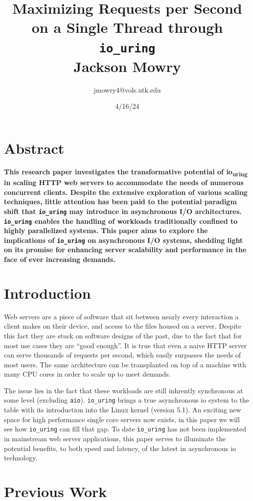 \documentclass[letterpaper, 10pt, twocolumn]{article}
\author{jmowry4@vols.utk.edu}
\date{4/16/24}
\title{\textbf{Maximizing Requests per Second on a Single Thread through \texttt{io\_uring}}\\\medskip
\large Jackson Mowry}
\begin{document}
\maketitle

\section{Abstract}
\label{sec:org684a27b}
\textbf{This research paper investigates the transformative potential of io\textsubscript{uring} in scaling HTTP web servers to accommodate the needs of numerous concurrent clients. Despite the extensive exploration of various scaling techniques, little attention has been paid to the potential paradigm shift that \texttt{io\_uring} may introduce in asynchronous I/O architectures. \texttt{io\_uring} enables the handling of workloads traditionally confined to highly parallelized systems. This paper aims to explore the implications of \texttt{io\_uring} on asynchronous I/O systems, shedding light on its promise for enhancing server scalability and performance in the face of ever increasing demands.}

\section{Introduction}
\label{sec:org8d44564}
Web servers are a piece of software that sit between nearly every interaction a client makes on their device, and access to the files housed on a server. Despite this fact they are stuck on software designs of the past, due to the fact that for most use cases they are ``good enough''. It is true that even a naive HTTP server can serve thousands of requests per second, which easily surpasses the needs of most users. The same architecture can be transplanted on top of a machine with many CPU cores in order to scale up to meet demands.

The issue lies in the fact that these workloads are still inhrently synchronous at some level (excluding \texttt{aio}). \texttt{io\_uring} brings a true asynchronous io system to the table with its introduction into the Linux kernel (version 5.1). An exciting new space for high performance single core servers now exists, in this paper we will see how \texttt{io\_uring} can fill that gap. To date \texttt{io\_uring} has not been implemented in mainstream web server applications, this paper serves to illuminate the potential benefits, to both speed and latency, of the latest in asynchronous io technology.

\section{Previous Work}
\label{sec:orga188553}
\end{document}
